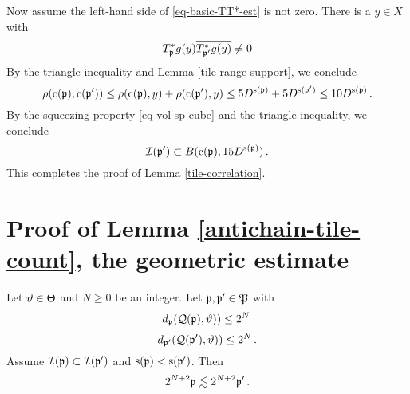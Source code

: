 {Now assume the left-hand side of \eqref{eq-basic-TT*-est} is not zero.
There is a $y\in X$ with
\begin{equation}
    T^*_{{\mathfrak p}}g(y)\overline{T^*_{{\mathfrak p}'}g(y)}\neq 0
\end{equation}
By the triangle inequality and Lemma \ref{tile-range-support}, we conclude
\begin{equation}
   \rho({\mathrm{c}}({\mathfrak p}),{\mathrm{c}}({\mathfrak p}'))\le  \rho({\mathrm{c}}({\mathfrak p}),y) +\rho({\mathrm{c}}({\mathfrak p}'),y)
   \le 5D^{{\mathrm{s}}({\mathfrak p})}+5D^{{\mathrm{s}}({\mathfrak p}')}\le 10 D^{{\mathrm{s}}({\mathfrak p})}\, .
\end{equation}
By the squeezing property \eqref{eq-vol-sp-cube} and the triangle inequality,
we conclude
\begin{equation}
    {\mathcal{I}}({\mathfrak p}') \subset B({\mathrm{c}}({\mathfrak p}), 15D^{{\mathrm{s}}({\mathfrak p})})\, .
\end{equation}
   This completes the proof of Lemma  \ref{tile-correlation}.





\section{Proof of Lemma \ref{antichain-tile-count}, the geometric estimate}
\label{subsec-geolem}


\begin{lemma}\label{tile-reach}
Let ${\vartheta}\in {\Theta}$ and $N\ge0$ be an integer.
Let ${\mathfrak p}, {\mathfrak p}'\in {\mathfrak P}$ with
\begin{equation}\label{eqassumedismfa}
    d_{{\mathfrak p}}({\mathcal{Q}}({\mathfrak p}), {\vartheta}))\le 2^N\,
\end{equation}
\begin{equation}\label{eqassumedismfap}
    d_{{\mathfrak p}'}({\mathcal{Q}}({\mathfrak p}'), {\vartheta}))\le 2^N\, .
\end{equation}
Assume ${\mathcal{I}}({\mathfrak p})\subset {\mathcal{I}}({\mathfrak p}')$ and ${\mathrm{s}}({\mathfrak p})<{\mathrm{s}}({\mathfrak p}')$.
Then
\begin{equation}\label{lp'lp''}2^{N+2}{\mathfrak p}\lesssim 2^{N+2} {\mathfrak p}'\, .
\end{equation}
\end{lemma}

}
